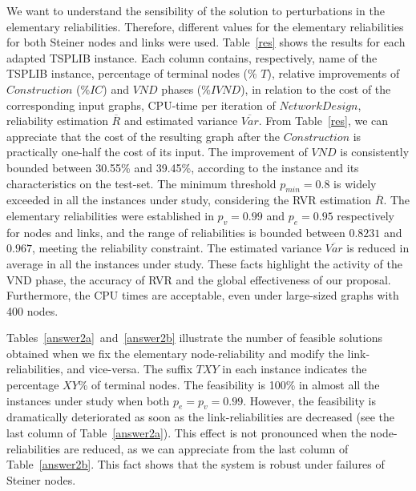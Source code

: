 \documentclass{llncs}
\begin{document}
We want to understand the sensibility of the solution to perturbations in the elementary reliabilities. 
Therefore, different values for the elementary reliabilities for both Steiner nodes and links were used. Table~\ref{res} shows the results for each adapted TSPLIB instance. Each column contains, respectively, name of the TSPLIB instance, percentage of terminal nodes (\% $T$), 
relative improvements of $Construction$  (\%$IC$) and $VND$ phases (\%$IVND$), in relation to the cost of the corresponding input graphs, CPU-time per iteration of $NetworkDesign$, 
reliability estimation $\overline{R}$ and estimated variance $\overline{Var}$. 
From Table~\ref{res}, we can appreciate that the cost of the resulting graph after the $Construction$ is practically one-half the cost of its input. The improvement of $VND$ is consistently bounded between 30.55\% and 39.45\%, according to the instance and its characteristics on the test-set. The minimum threshold $p_{min}=0.8$ is widely exceeded in all the instances under study, considering the RVR 
estimation $\overline{R}$. The elementary reliabilities were established in $p_v=0.99$ and $p_e=0.95$ respectively for nodes and links, and the range of reliabilities is bounded between $0.8231$ and $0.967$, meeting the reliability constraint. The estimated variance 
$\overline{Var}$ is reduced in average in all the instances under study. These facts highlight the activity of the VND phase, the accuracy of RVR and the global effectiveness of our proposal. Furthermore, the CPU times are acceptable, even under large-sized graphs with 400 nodes.

Tables~\ref{answer2a}~and~\ref{answer2b} illustrate the number of feasible solutions 
obtained when we fix the elementary node-reliability and modify the link-reliabilities, and vice-versa. The suffix $TXY$ in each instance indicates the percentage $XY$\% of 
terminal nodes. The feasibility is 100\% in almost all the instances under study when 
both $p_e=p_v=0.99$. However, the feasibility is dramatically deteriorated as soon as 
the link-reliabilities are decreased (see the last column of Table~\ref{answer2a}). 
This effect is not pronounced when the node-reliabilities are reduced, as we can appreciate from the last column of Table~\ref{answer2b}. This fact shows that the system is robust under failures of Steiner nodes. 
\end{document}
